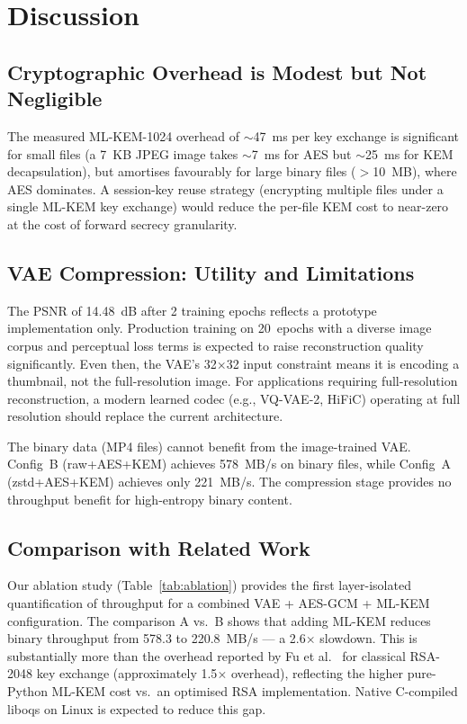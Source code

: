 \documentclass[twocolumn]{article}
\begin{document}
\section{Discussion}

\subsection{Cryptographic Overhead is Modest but Not Negligible}

The measured ML-KEM-1024 overhead of $\sim$47~ms per key exchange is significant
for small files (a 7~KB JPEG image takes $\sim$7~ms for AES but $\sim$25~ms for
KEM decapsulation), but amortises favourably for large binary files ($>$10~MB),
where AES dominates. A session-key reuse strategy (encrypting multiple files under
a single ML-KEM key exchange) would reduce the per-file KEM cost to near-zero at
the cost of forward secrecy granularity.

\subsection{VAE Compression: Utility and Limitations}

The PSNR of 14.48~dB after 2 training epochs reflects a prototype implementation
only. Production training on 20~epochs with a diverse image corpus and perceptual
loss terms is expected to raise reconstruction quality significantly. Even then,
the VAE's 32$\times$32 input constraint means it is encoding a thumbnail, not the
full-resolution image. For applications requiring full-resolution reconstruction,
a modern learned codec (e.g., VQ-VAE-2, HiFiC) operating at full resolution
should replace the current architecture.

The binary data (MP4 files) cannot benefit from the image-trained VAE. Config~B
(raw+AES+KEM) achieves 578~MB/s on binary files, while Config~A (zstd+AES+KEM)
achieves only 221~MB/s. The compression stage provides no throughput benefit for
high-entropy binary content.

\subsection{Comparison with Related Work}

Our ablation study (Table~\ref{tab:ablation}) provides the first layer-isolated
quantification of throughput for a combined VAE + AES-GCM + ML-KEM configuration.
The comparison A vs.\ B shows that adding ML-KEM reduces binary throughput from
578.3 to 220.8~MB/s --- a 2.6$\times$ slowdown. This is substantially more than
the overhead reported by Fu et al.\ \cite{fu} for classical RSA-2048 key exchange
(approximately 1.5$\times$ overhead), reflecting the higher pure-Python ML-KEM
cost vs.\ an optimised RSA implementation. Native C-compiled liboqs on Linux is
expected to reduce this gap.
\end{document}
